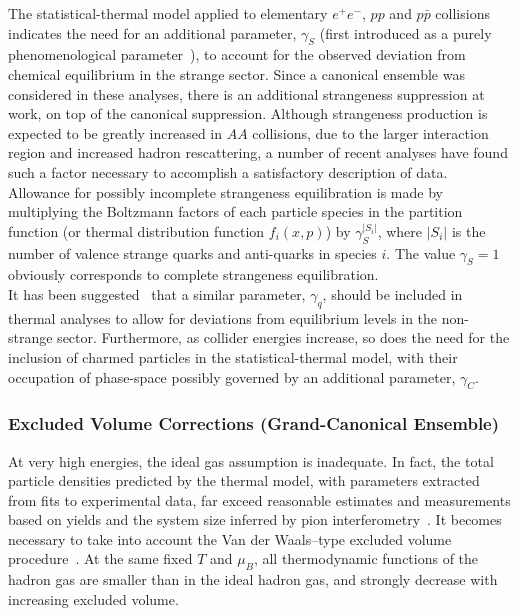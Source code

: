 \documentclass{elsarticle}
\begin{document}
The statistical-thermal model applied to elementary $e^+e^-$, $pp$ and
$p\bar{p}$ collisions~\cite{Becattini:1995if,Becattini:1997rv} indicates the need for an
additional parameter, $\gamma_S$ (first introduced as a purely 
phenomenological parameter~\cite{Koch:1986ud,Rafelski:1991rh,Letessier:1993qa,Slotta:1995bh}), to account for the
observed deviation from chemical equilibrium in the strange
sector. Since a canonical ensemble was considered in these analyses,
there is an additional strangeness suppression at work, on top of the
canonical suppression. Although strangeness production is expected to
be greatly increased in $AA$ collisions, due to the larger interaction
region and increased hadron rescattering, a number of recent analyses 
\cite{Becattini:1997ii,Becattini:2003wp,Bearden:2002ib,Cleymans:2001at,Cleymans:2002xu,Cleymans:2003yp} have found such a factor necessary to
accomplish a satisfactory description of data.\\

Allowance for possibly incomplete strangeness equilibration is made by 
multiplying the Boltzmann factors of each particle species in the 
partition function (or thermal distribution function $f_i(x,p)$) 
by $\gamma_S^{\left|S_i\right|}$, where $\left|S_i\right|$ is 
the number of valence strange quarks and anti-quarks in species 
$i$. The value $\gamma_S = 1$ obviously corresponds to
complete strangeness equilibration.\\  

It has been suggested~\cite{Letessier:1998sz} that a similar parameter, 
$\gamma_q$, should be included in thermal analyses to allow for 
deviations from equilibrium levels in the non-strange sector. 
Furthermore, as collider energies increase, so does the need for the inclusion of 
charmed particles in the statistical-thermal model, with their 
occupation of phase-space possibly governed by an additional 
parameter, $\gamma_C$.\\  

\subsubsection{Excluded Volume Corrections (Grand-Canonical Ensemble)}\label{Excl Vol Corrections}

At very high energies, the ideal gas assumption is inadequate. In fact, the 
total particle densities predicted by the thermal model, with parameters 
extracted from fits to experimental data, far exceed reasonable estimates 
and measurements based on yields and the system size inferred by pion 
interferometry~\cite{Yen:1997rv}. It becomes necessary to take into account the Van der Waals--type excluded 
volume procedure~\cite{Yen:1997rv,Rischke:1991ke,Cleymans:1992jz}. At the same fixed $T$ and $\mu_B$, all 
thermodynamic functions of the hadron gas are smaller than in the ideal 
hadron gas, and strongly decrease with increasing excluded volume.\\
\end{document}
